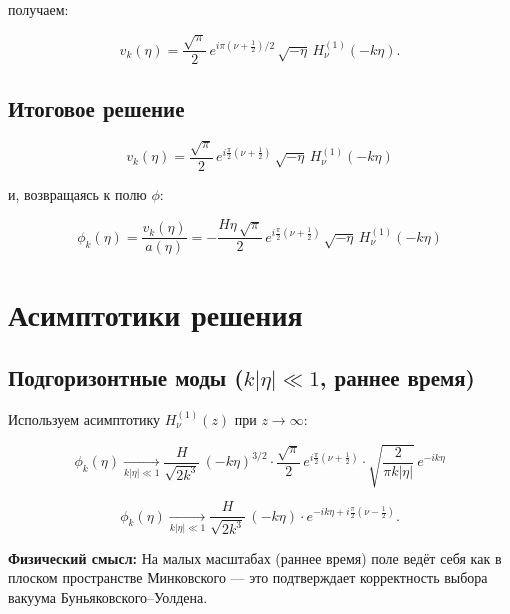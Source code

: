 \documentclass[12pt,a4paper]{article}
\begin{document}
получаем:

\begin{equation}
v_k(\eta) = \frac{\sqrt{\pi}}{2}\,e^{i\pi(\nu + \tfrac{1}{2})/2}\,\sqrt{-\eta}\,H_\nu^{(1)}(-k\eta).
\end{equation}

\subsection{Итоговое решение}

\begin{equation}
\boxed{\;v_k(\eta) = \frac{\sqrt{\pi}}{2}\,e^{i\frac{\pi}{2}(\nu + \frac{1}{2})}\,\sqrt{-\eta}\,H_\nu^{(1)}(-k\eta)\;}
\end{equation}

и, возвращаясь к полю $\phi$:

\begin{equation}
\boxed{\;\phi_k(\eta) = \frac{v_k(\eta)}{a(\eta)} = -\frac{H\eta\,\sqrt{\pi}}{2}\,e^{i\frac{\pi}{2}(\nu + \frac{1}{2})}\,\sqrt{-\eta}\,H_\nu^{(1)}(-k\eta)\;}
\end{equation}

\section{Асимптотики решения}

\subsection{Подгоризонтные моды ($k|\eta| \ll 1$, раннее время)}

Используем асимптотику $H_\nu^{(1)}(z)$ при $z \to \infty$:

\begin{equation}
\phi_k(\eta) \xrightarrow[k|\eta|\ll 1]{} \frac{H}{\sqrt{2k^3}}\,(-k\eta)^{3/2}\cdot\frac{\sqrt{\pi}}{2}\,e^{i\frac{\pi}{2}(\nu + \frac{1}{2})}\cdot\sqrt{\frac{2}{\pi k|\eta|}}\,e^{-ik\eta}
\end{equation}

\begin{equation}
\phi_k(\eta) \xrightarrow[k|\eta|\ll 1]{} \frac{H}{\sqrt{2k^3}}\,(-k\eta)\cdot e^{-ik\eta + i\frac{\pi}{2}(\nu - \frac{1}{2})}.
\end{equation}

\textbf{Физический смысл:} На малых масштабах (раннее время) поле ведёт себя
как в плоском пространстве Минковского — это подтверждает корректность
выбора вакуума Буньяковского--Уолдена.
\end{document}
